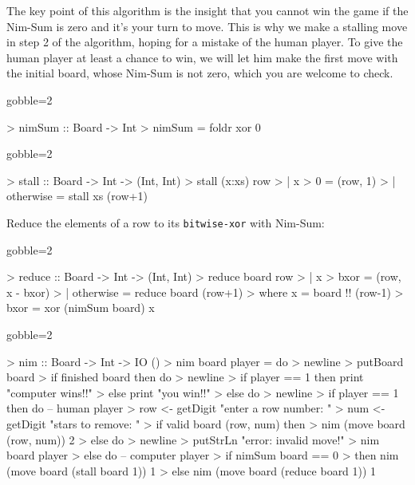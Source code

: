 The key point of this algorithm is the insight that you cannot win the game if the Nim-Sum is zero and it's your turn to move.
This is why we make a stalling move in step 2 of the algorithm, hoping for a mistake of the human player.
To give the human player at least a chance to win, we will let him make the first move with the initial board, whose Nim-Sum is not zero, which you are welcome to check.

\begin{impl}
\end{impl}
\begin{haskellcode*}{gobble=2}

> nimSum :: Board -> Int
> nimSum = foldr xor 0

\end{haskellcode*}

\begin{impl}
\end{impl}
\begin{haskellcode*}{gobble=2}

> stall :: Board -> Int -> (Int, Int)
> stall (x:xs) row
>     | x > 0 = (row, 1)
>     | otherwise = stall xs (row+1)

\end{haskellcode*}

\begin{impl}[Steps 3 - 5]
Reduce the elements of a row to its \texttt{bitwise-xor} with Nim-Sum:
\end{impl}
\begin{haskellcode*}{gobble=2}

> reduce :: Board -> Int -> (Int, Int)
> reduce board row
>     | x > bxor = (row, x - bxor)
>     | otherwise = reduce board (row+1)
>     where x = board !! (row-1)
>           bxor = xor (nimSum board) x

\end{haskellcode*}

\begin{impl}
\end{impl}
\begin{haskellcode*}{gobble=2}

> nim :: Board -> Int -> IO ()
> nim board player = do
>     newline
>     putBoard board
>     if finished board then do 
>         newline
>         if player == 1 then print "computer wins!!"
>         else print "you win!!"
>     else do
>         newline
>         if player == 1 then do -- human player
>             row <- getDigit "enter a row number: "
>             num <- getDigit "stars to remove: "
>             if valid board (row, num) then
>                 nim (move board (row, num)) 2
>             else do
>                 newline
>                 putStrLn "error: invalid move!"
>                 nim board player
>         else do -- computer player
>             if nimSum board == 0
>                 then nim (move board (stall board 1)) 1
>                 else nim (move board (reduce board 1)) 1

\end{haskellcode*}

